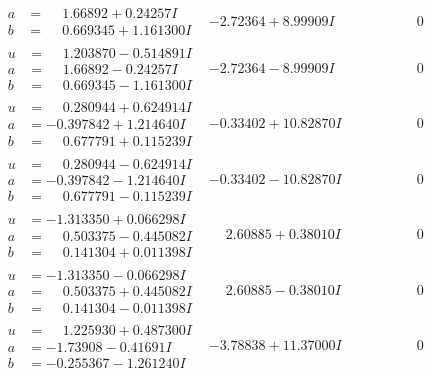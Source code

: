 \documentclass[1p]{elsarticle_modified}
\theoremstyle{definition}
\begin{document}
$$\begin{array}{c|c|c}
\begin{aligned}
a &= \phantom{-}1.66892 + 0.24257 I \\
b &= \phantom{-}0.669345 + 1.161300 I\end{aligned}
 & -2.72364 + 8.99909 I & \phantom{-0.000000 } 0 \\ \hline\begin{aligned}
u &= \phantom{-}1.203870 - 0.514891 I \\
a &= \phantom{-}1.66892 - 0.24257 I \\
b &= \phantom{-}0.669345 - 1.161300 I\end{aligned}
 & -2.72364 - 8.99909 I & \phantom{-0.000000 } 0 \\ \hline\begin{aligned}
u &= \phantom{-}0.280944 + 0.624914 I \\
a &= -0.397842 + 1.214640 I \\
b &= \phantom{-}0.677791 + 0.115239 I\end{aligned}
 & -0.33402 + 10.82870 I & \phantom{-0.000000 } 0 \\ \hline\begin{aligned}
u &= \phantom{-}0.280944 - 0.624914 I \\
a &= -0.397842 - 1.214640 I \\
b &= \phantom{-}0.677791 - 0.115239 I\end{aligned}
 & -0.33402 - 10.82870 I & \phantom{-0.000000 } 0 \\ \hline\begin{aligned}
u &= -1.313350 + 0.066298 I \\
a &= \phantom{-}0.503375 - 0.445082 I \\
b &= \phantom{-}0.141304 + 0.011398 I\end{aligned}
 & \phantom{-}2.60885 + 0.38010 I & \phantom{-0.000000 } 0 \\ \hline\begin{aligned}
u &= -1.313350 - 0.066298 I \\
a &= \phantom{-}0.503375 + 0.445082 I \\
b &= \phantom{-}0.141304 - 0.011398 I\end{aligned}
 & \phantom{-}2.60885 - 0.38010 I & \phantom{-0.000000 } 0 \\ \hline\begin{aligned}
u &= \phantom{-}1.225930 + 0.487300 I \\
a &= -1.73908 - 0.41691 I \\
b &= -0.255367 - 1.261240 I\end{aligned}
 & -3.78838 + 11.37000 I & \phantom{-0.000000 } 0 \\ \hline\begin{aligned}

\end{aligned}
\end{array}$$
\end{document}

